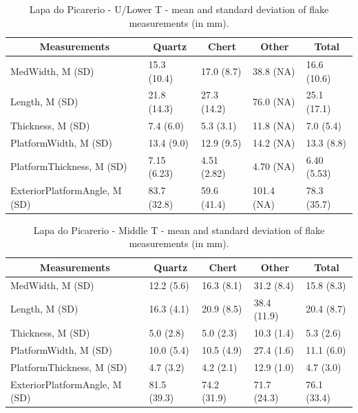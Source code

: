 \documentclass[12pt,twoside]{reedthesis}
\begin{document}
\newpage
\begin{table}[!h]

\caption{\label{tab:flakemetricsLP1}Lapa do Picarerio - U/Lower T - mean and standard deviation of flake measurements (in mm).}
\centering
\fontsize{9}{11}\selectfont
\begin{tabular}[t]{lllll}
\toprule
\multicolumn{1}{c}{\textbf{Measurements}} & \multicolumn{1}{c}{\textbf{Quartz}} & \multicolumn{1}{c}{\textbf{Chert}} & \multicolumn{1}{c}{\textbf{Other}} & \multicolumn{1}{c}{\textbf{Total}}\\
\midrule
MedWidth, M (SD) & 15.3 (10.4) & 17.0 (8.7) & 38.8 (NA) & 16.6 (10.6)\\
Length, M (SD) & 21.8 (14.3) & 27.3 (14.2) & 76.0 (NA) & 25.1 (17.1)\\
Thickness, M (SD) & 7.4 (6.0) & 5.3 (3.1) & 11.8 (NA) & 7.0 (5.4)\\
PlatformWidth, M (SD) & 13.4 (9.0) & 12.9 (9.5) & 14.2 (NA) & 13.3 (8.8)\\
PlatformThickness, M (SD) & 7.15 (6.23) & 4.51 (2.82) & 4.70 (NA) & 6.40 (5.53)\\
\addlinespace
ExteriorPlatformAngle, M (SD) & 83.7 (32.8) & 59.6 (41.4) & 101.4 (NA) & 78.3 (35.7)\\
\bottomrule
\end{tabular}
\end{table}
\begin{table}[!h]

\caption{\label{tab:flakemetricsLP2}Lapa do Picarerio - Middle T - mean and standard deviation of flake measurements (in mm).}
\centering
\fontsize{9}{11}\selectfont
\begin{tabular}[t]{lllll}
\toprule
\multicolumn{1}{c}{\textbf{Measurements}} & \multicolumn{1}{c}{\textbf{Quartz}} & \multicolumn{1}{c}{\textbf{Chert}} & \multicolumn{1}{c}{\textbf{Other}} & \multicolumn{1}{c}{\textbf{Total}}\\
\midrule
MedWidth, M (SD) & 12.2 (5.6) & 16.3 (8.1) & 31.2 (8.4) & 15.8 (8.3)\\
Length, M (SD) & 16.3 (4.1) & 20.9 (8.5) & 38.4 (11.9) & 20.4 (8.7)\\
Thickness, M (SD) & 5.0 (2.8) & 5.0 (2.3) & 10.3 (1.4) & 5.3 (2.6)\\
PlatformWidth, M (SD) & 10.0 (5.4) & 10.5 (4.9) & 27.4 (1.6) & 11.1 (6.0)\\
PlatformThickness, M (SD) & 4.7 (3.2) & 4.2 (2.1) & 12.9 (1.0) & 4.7 (3.0)\\
\addlinespace
ExteriorPlatformAngle, M (SD) & 81.5 (39.3) & 74.2 (31.9) & 71.7 (24.3) & 76.1 (33.4)\\
\bottomrule
\end{tabular}
\end{table}
\newpage
\end{document}
